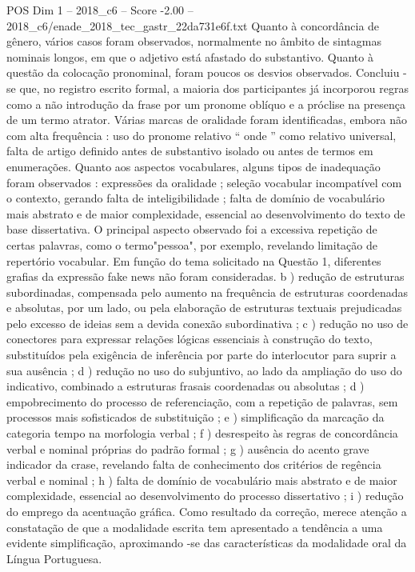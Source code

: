 \begin{textsample}{POS Dim 1 – 2018\_c6 – Score -2.00 – 2018\_c6/enade\_2018\_tec\_gastr\_22da731e6f.txt}
Quanto à concordância de gênero, vários casos foram observados, normalmente no âmbito de sintagmas nominais longos, em que o adjetivo está afastado do substantivo.
Quanto à questão da colocação pronominal, foram poucos os desvios observados.
Concluiu -se que, no registro escrito formal, a maioria dos participantes já incorporou regras como a não introdução da frase por um pronome oblíquo e a próclise na presença de um termo atrator.
Várias marcas de oralidade foram identificadas, embora não com alta frequência : uso do pronome relativo “ onde ” como relativo universal, falta de artigo definido antes de substantivo isolado ou antes de termos em enumerações.
Quanto aos aspectos vocabulares, alguns tipos de inadequação foram observados : expressões da oralidade ; seleção vocabular incompatível com o contexto, gerando falta de inteligibilidade ; falta de domínio de vocabulário mais abstrato e de maior complexidade, essencial ao desenvolvimento do texto de base dissertativa.
O principal aspecto observado foi a excessiva repetição de certas palavras, como o termo"pessoa", por exemplo, revelando limitação de repertório vocabular.
Em função do tema solicitado na Questão 1, diferentes grafias da expressão fake news não foram consideradas. b ) redução de estruturas subordinadas, compensada pelo aumento na frequência de estruturas coordenadas e absolutas, por um lado, ou pela elaboração de estruturas textuais prejudicadas pelo excesso de ideias sem a devida conexão subordinativa ; c ) redução no uso de conectores para expressar relações lógicas essenciais à construção do texto, substituídos pela exigência de inferência por parte do interlocutor para suprir a sua ausência ; d ) redução no uso do subjuntivo, ao lado da ampliação do uso do indicativo, combinado a estruturas frasais coordenadas ou absolutas ; d ) empobrecimento do processo de referenciação, com a repetição de palavras, sem processos mais sofisticados de substituição ; e ) simplificação da marcação da categoria tempo na morfologia verbal ; f ) desrespeito às regras de concordância verbal e nominal próprias do padrão formal ; g ) ausência do acento grave indicador da crase, revelando falta de conhecimento dos critérios de regência verbal e nominal ; h ) falta de domínio de vocabulário mais abstrato e de maior complexidade, essencial ao desenvolvimento do processo dissertativo ; i ) redução do emprego da acentuação gráfica.
Como resultado da correção, merece atenção a constatação de que a modalidade escrita tem apresentado a tendência a uma evidente simplificação, aproximando -se das características da modalidade oral da Língua Portuguesa.

\end{textsample}

